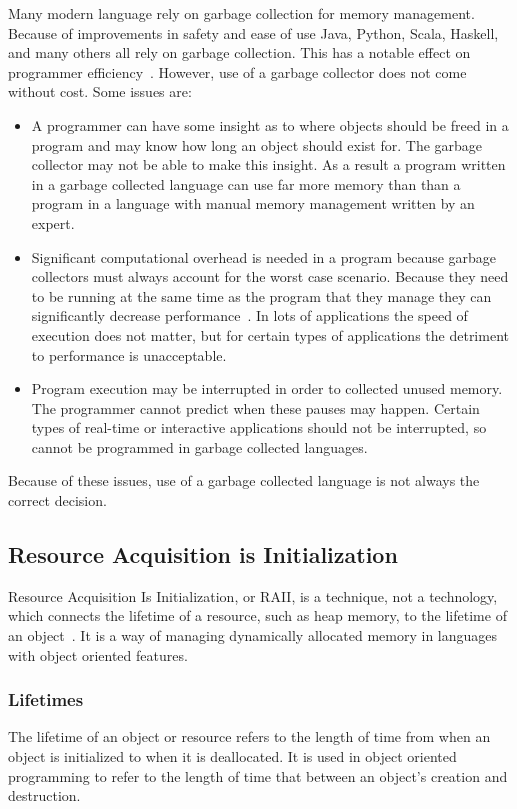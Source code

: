 Many modern language rely on garbage collection for memory management. Because
of improvements in safety and ease of use Java, Python, Scala, Haskell, and
many others all rely on garbage collection. This has a notable effect on
programmer efficiency~\cite{garbage}. However, use of a garbage collector does
not come without cost. Some issues are:

\begin{itemize}
    \item
        A programmer can have some insight as to where objects should be freed
        in a program and may know how long an object should exist for. The
        garbage collector may not be able to make this insight. As a result a
        program written in a garbage collected language can use far more memory
        than than a program in a language with manual memory management written
        by an expert.
    \item
        Significant computational overhead is needed in a program because
        garbage collectors must always account for the worst case scenario.
        Because they need to be running at the same time as the program that
        they manage they can significantly decrease performance~\cite{garbage}.
        In lots of applications the speed of execution does not matter, but for
        certain types of applications the detriment to performance is
        unacceptable.
    \item
        Program execution may be interrupted in order to collected unused
        memory. The programmer cannot predict when these pauses may happen.
        Certain types of real-time or interactive applications should not be
        interrupted, so cannot be programmed in garbage collected languages.
\end{itemize}

Because of these issues, use of a garbage collected language is not always the
correct decision.

\subsection{Resource Acquisition is Initialization}
Resource Acquisition Is Initialization, or RAII, is a technique, not a
technology, which connects the lifetime of a resource, such as heap memory, to
the lifetime of an object~\cite{cppref}. It is a way of managing dynamically
allocated memory in languages with object oriented features.

\subsubsection{Lifetimes}
The lifetime of an object or resource refers to the length of time from when an
object is initialized to when it is deallocated. It is used in object oriented
programming to refer to the length of time that between an object's creation
and destruction. 


